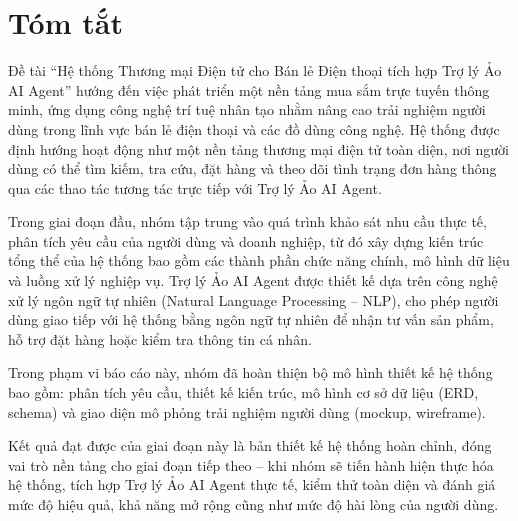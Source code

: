 \section*{Tóm tắt}
\thispagestyle{empty}

Đề tài “Hệ thống Thương mại Điện tử cho Bán lẻ Điện thoại tích hợp Trợ lý Ảo AI Agent” hướng đến việc phát triển một nền tảng mua sắm trực tuyến thông minh, ứng dụng công nghệ trí tuệ nhân tạo nhằm nâng cao trải nghiệm người dùng trong lĩnh vực bán lẻ điện thoại và các đồ dùng công nghệ. Hệ thống được định hướng hoạt động như một nền tảng thương mại điện tử toàn diện, nơi người dùng có thể tìm kiếm, tra cứu, đặt hàng và theo dõi tình trạng đơn hàng thông qua các thao tác tương tác trực tiếp với Trợ lý Ảo AI Agent.

Trong giai đoạn đầu, nhóm tập trung vào quá trình khảo sát nhu cầu thực tế, phân tích yêu cầu của người dùng và doanh nghiệp, từ đó xây dựng kiến trúc tổng thể của hệ thống bao gồm các thành phần chức năng chính, mô hình dữ liệu và luồng xử lý nghiệp vụ. Trợ lý Ảo AI Agent được thiết kế dựa trên công nghệ xử lý ngôn ngữ tự nhiên (Natural Language Processing – NLP), cho phép người dùng giao tiếp với hệ thống bằng ngôn ngữ tự nhiên để nhận tư vấn sản phẩm, hỗ trợ đặt hàng hoặc kiểm tra thông tin cá nhân.

Trong phạm vi báo cáo này, nhóm đã hoàn thiện bộ mô hình thiết kế hệ thống bao gồm: phân tích yêu cầu, thiết kế kiến trúc, mô hình cơ sở dữ liệu (ERD, schema) và giao diện mô phỏng trải nghiệm người dùng (mockup, wireframe).

Kết quả đạt được của giai đoạn này là bản thiết kế hệ thống hoàn chỉnh, đóng vai trò nền tảng cho giai đoạn tiếp theo – khi nhóm sẽ tiến hành hiện thực hóa hệ thống, tích hợp Trợ lý Ảo AI Agent thực tế, kiểm thử toàn diện và đánh giá mức độ hiệu quả, khả năng mở rộng cũng như mức độ hài lòng của người dùng.\clearpage
{}


